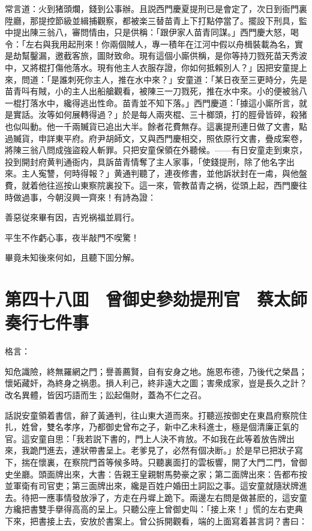 常言道：火到猪頭爛，錢到公事辦。且説西門慶夏提刑已是會定了，次日到衙門裏陞廳，那提控節級並緝捕觀察，都被楽三替苗青上下打點停當了。擺設下刑具，監中提出陳三翁八，審問情由，只是供稱：「跟伊家人苗青同謀。」西門慶大怒，喝令：「左右與我用起刑來！你兩個賊人，專一積年在江河中假以舟楫裝載為名，實是劫幫鑿漏，邀截客旅，圖財致命。現有這個小廝供稱，是你等持刀戮死苗天秀波中，又將棍打傷他落水。現有他主人衣服存證，你如何抵賴別人？」因把安童提上來，問道：「是誰刺死你主人，推在水中來？」安童道：「某日夜至三更時分，先是苗青呌有賊，小的主人出船艙觀看，被陳三一刀戮死，推在水中來。小的便被翁八一棍打落水中，纔得逃出性命。苗青並不知下落。」西門慶道：「據這小廝所言，就是實話。汝等如何展轉得過？」於是每人兩夾棍、三十榔頭，打的脛骨皆碎，殺猪也似叫動。他一千兩贓貨已追出大半。餘者花費無存。這裏提刑連日做了文書，點過贓貨，申詳東平府。府尹胡師文，又與西門慶相交，照依原行文書，疊成案卷，將陳三翁八問成強盜殺人斬罪。只把安童保領在外聽候。——有日安童走到東京，投到開封府黄判通衙内，具訴苗青情奪了主人家事，「使錢提刑，除了他名字出來。主人寃讐，何時得報？」黄通判聽了，連夜修書，並他訴狀封在一䖏，與他盤費，就着他往巡按山東察院裏投下。這一來，管教苗青之祸，從頭上起，西門慶往時做過事，今朝沒興一齊來！有詩為證：

善惡従來畢有因，吉兇祸福並肩行。

平生不作虧心事，夜半敲門不喫驚！

畢竟未知後來何如，且聽下囬分解。

\chapter*{第四十八囬　曾御史參劾提刑官　蔡太師奏行七件事}

格言：

知危識險，終無羅網之門；譽善薦賢，自有安身之地。施恩布德，乃後代之榮昌；懷妬藏奸，為終身之祸患。損人利己，終非遠大之圖；害衆成家，豈是長久之計？改名異體，皆因巧語而生；訟起傷財，蓋為不仁之召。

話説安童領着書信，辭了黃通判，往山東大道而來。打聽巡按御史在東昌府察院住扎，姓曾，雙名孝序，乃都御史曾布之子，新中乙未科進士，極是個清廉正氣的官。這安童自思：「我若説下書的，門上人決不肯放。不如我在此等着放告牌出來，我跪門進去，連狀帶書呈上。老爹見了，必然有個决断。」於是早已把狀子寫下，揣在懷裏，在察院門首等候多時。只聽裏面打的雲板響，開了大門二門，曾御史坐廳。頭面牌出來，大書：告親王皇親駙馬勢豪之家；第二面牌出來：告都布按並軍衛有司官吏；第三面牌出來，纔是百姓户婚田土詞訟之事。這安童就隨狀牌進去。待把一應事情發放淨了，方走在丹墀上跪下。兩邊左右問是做甚麽的，這安童方纔把書雙手擧得高高的呈上。只聽公座上曾御史叫：「接上來！」慌的左右吏典下來，把書接上去，安放於書案上。曾公拆開觀看，端的上面寫着甚言詞？書曰：

